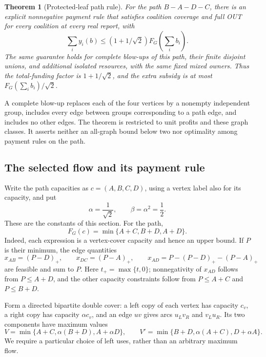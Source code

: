 \documentclass[11pt]{article}
\newtheorem{theorem}{Theorem}[section]
\theoremstyle{definition}\newtheorem{definition}[theorem]{Definition}
\theoremstyle{remark}\newtheorem{remark}[theorem]{Remark}
\begin{document}
\begin{theorem}[Protected-leaf path rule]\label{graph:theorem}
For the path $B-A-D-C$, there is an explicit nonnegative payment rule that
satisfies coalition coverage and full OUT for every coalition at every
real report, with
\begin{equation}\label{graph:funding-bound}
 \sum_i y_i(b)\le(1+1/\sqrt2)F_G\left(\sum_i b_i\right).
\end{equation}
The same guarantee holds for complete blow-ups of this path, their finite
disjoint unions, and additional isolated resources, with the same fixed
mixed owners. Thus the total-funding factor is $1+1/\sqrt2$, and the
extra subsidy is at most $F_G(\sum_i b_i)/\sqrt2$.
\end{theorem}

A complete blow-up replaces each of the four vertices by a nonempty
independent group, includes every edge between groups corresponding to a
path edge, and includes no other edges. The theorem is restricted to unit
profits and these graph classes. It asserts neither an all-graph bound
below two nor optimality among payment rules on the path.

\subsection{The selected flow and its payment rule}

Write the path capacities as $c=(A,B,C,D)$, using a vertex label also for
its capacity, and put
\[
 \alpha=\frac1{\sqrt2},\qquad \beta=\alpha^2=\frac12.
\]
These are the constants of this section. For the path,
\begin{equation}\label{graph:path-value}
 F_G(c)=\min\{A+C,B+D,A+D\}.
\end{equation}
Indeed, each expression is a vertex-cover capacity and hence an upper
bound. If $P$ is their minimum, the edge quantities
\[
 x_{AB}=(P-D)_+,\qquad x_{DC}=(P-A)_+,\qquad
 x_{AD}=P-(P-D)_+-(P-A)_+
\]
are feasible and sum to $P$. Here $t_+=\max\{t,0\}$;
nonnegativity of $x_{AD}$ follows from $P\le A+D$, and the other capacity
constraints follow from $P\le A+C$ and $P\le B+D$.

Form a directed bipartite double cover: a left copy of each vertex has
capacity $c_v$, a right copy has capacity $\alpha c_v$, and an edge $uv$
gives arcs $u_Lv_R$ and $v_Lu_R$. Its two components have maximum values
\begin{equation}\label{graph:oriented-values}
 V=\min\{A+C,\alpha(B+D),A+\alpha D\},\qquad
 V'=\min\{B+D,\alpha(A+C),D+\alpha A\}.
\end{equation}
We require a particular choice of left uses, rather than an arbitrary
maximum flow.
\end{document}
